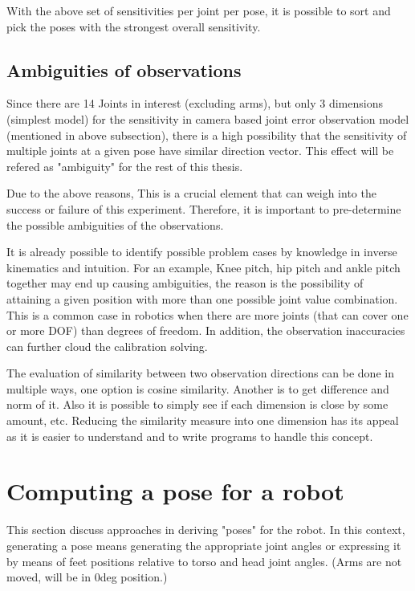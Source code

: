 \documentclass[english, printversion, nomenclature, notitle]{tuvisionthesis} %
\begin{document}
With the above set of sensitivities per joint per pose, it is possible to sort and pick the poses with the strongest overall sensitivity.

\subsection{Ambiguities of observations}
\label{subsec:ambiguities}

Since there are 14 Joints in interest (excluding arms), but only 3 dimensions (simplest model) for the sensitivity in camera based joint error observation model (mentioned in above subsection), there is a high possibility that the sensitivity of multiple joints at a given pose have similar direction vector. This effect will be refered as "ambiguity" for the rest of this thesis.
 
Due to the above reasons, This is a crucial element that can weigh into the success or failure of this experiment. Therefore, it is important to pre-determine the possible ambiguities of the observations. 

It is already possible to identify possible problem cases by knowledge in inverse kinematics and intuition. For an example, Knee pitch, hip pitch and ankle pitch together may end up causing ambiguities, the reason is the possibility of attaining a given position with more than one possible joint value combination. This is a common case in robotics when there are more joints (that can cover one or more DOF) than degrees of freedom. In addition, the observation inaccuracies can further cloud the calibration solving.

The evaluation of similarity between two observation directions can be done in multiple ways, one option is cosine similarity. Another is to get difference and norm of it. Also it is possible to simply see if each dimension is close by some amount, etc. Reducing the similarity measure into one dimension has its appeal as it is easier to understand and to write programs to handle this concept.


\section{Computing a pose for a robot}
This section discuss approaches in deriving "poses" for the robot. In this context, generating a pose means generating the appropriate joint angles or expressing it by means of feet positions relative to torso and head joint angles. (Arms are not moved, will be in 0deg position.)
\end{document}
